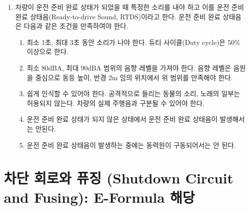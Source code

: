 \documentclass[final,a4paper,10pt]{report}
\begin{document}
\begin{enumerate}
  \item\label{rule:formula-technical.ready-to-drive-mode.rtds-conditions} 차량이 운전 준비 완료 상태가 되었을 때 특정한 소리를 내야 하고 이를 운전 준비 완료 상태음(Ready-to-drive Sound, RTDS)이라고 한다. 운전 준비 완료 상태음은 다음과 같은 조건을 만족하여야 한다.
    \begin{enumerate}
      \item\label{rule:formula-technical.ready-to-drive-mode.rtds-conditions.duration-1to3s-duty-50pct} 최소 1초, 최대 3초 동안 소리가 나야 한다. {\color{blue}듀티 사이클(Duty cycle)은 50\% 이상으로 한다.}
      \item\label{rule:formula-technical.ready-to-drive-mode.rtds-conditions.level-80to90dba-at-2m} 최소 80dBA, 최대 90dBA 범위의 음향 레벨을 가져야 한다. 음향 레벨은 음원을 중심으로 동등 높이, 반경 2m 임의 위치에서 위 범위를 만족해야 한다.
      \item\label{rule:formula-technical.ready-to-drive-mode.rtds-conditions.recognizable-distinct-sound} 쉽게 인식할 수 있어야 한다. 공격적으로 들리는 동물의 소리, 노래의 일부는 허용되지 않는다. 차량의 실제 주행음과 구분될 수 있어야 한다.
      \item\label{rule:formula-technical.ready-to-drive-mode.rtds-conditions.no-sound-before-rtd} 운전 준비 완료 상태가 되지 않은 상태에서 운전 준비 완료 상태음이 발생해서는 안된다.
      \item\label{rule:formula-technical.ready-to-drive-mode.rtds-conditions.no-drive-during-sound} 운전 준비 완료 상태음이 발생하는 중에는 동력원이 구동되어서는 안 된다.
    \end{enumerate}
\end{enumerate}

\chapter{차단 회로와 퓨징 (Shutdown Circuit and Fusing): E-Formula 해당}
\end{document}
